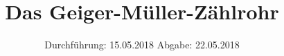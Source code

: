 
\usepackage{longtable}
\usepackage{wrapfig}
\usepackage{ dsfont }
\subject{VERSUCH 703}
\title{Das Geiger-Müller-Zählrohr}
\date{%
  \hspace{-2.5em}
  Durchführung: 15.05.2018
  \hspace{4em}
  Abgabe: 22.05.2018
}


  \setlength{\parindent}{0em}
  \maketitle
  \thispagestyle{empty}
  \newpage
  \tableofcontents
  \newpage





\printbibliography{}



